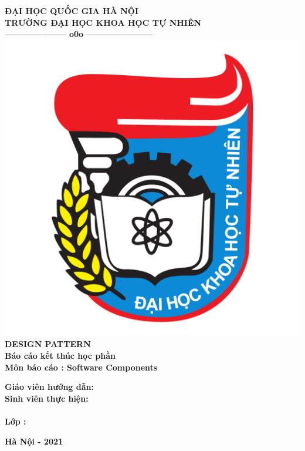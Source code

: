 \thispagestyle{empty}
\thisfancypage{
	\setlength{\fboxsep}{5pt}
	\shadowbox}{}

\begin{center}
	
	{\fontsize{13pt}{1}\selectfont\textbf{ĐẠI HỌC QUỐC GIA HÀ NỘI}}
	\\
	{\fontsize{13pt}{1}\selectfont\textbf{TRƯỜNG ĐẠI HỌC KHOA HỌC TỰ NHIÊN}}
	\\	
	\textbf{--------------------  o0o  ---------------------}\\[1cm]
	\includegraphics[scale=0.25]{GALLEYS/Logo-DH-Khoa-Hoc-Tu-Nhien-Ha-Noi-VNU-HUS.png} \\[1.2cm]
	\textbf{{\Huge DESIGN PATTERN}}
\textbf{}\\[1cm]
\textbf{{\large  Báo cáo kết thúc học phần}}\\[0.2cm]
\textbf{{\large Môn báo cáo : Software Components}}\\[1cm]
\end{center}
\begin{flushleft}
\hspace{1.5 cm} \textbf{ Giáo viên hướng dẫn:\hspace{0.4cm}{Quản Thái Hà}}\\[0.2cm]
\hspace{1.5 cm} \textbf{ Sinh viên thực hiện\hspace{0.3cm}:\hspace{0.2cm}{ Lê Quang Trường- 20001589}}\\[0.2cm]
\hspace{1.5 cm} \textbf{\hspace{4.9cm}{ Phan Thế Sơn- 20001579}}\\[0.2cm]
\hspace{1.7 cm} \textbf{Lớp\hspace{0.3 cm} \hspace{3.1cm}: \hspace{0.2 cm}{Máy tính và Khoa học thông tin ClC }}
\end{flushleft}

\vspace{1.0cm}
\begin{center}
\textbf{{\large Hà Nội - 2021}}\\
\end{center}